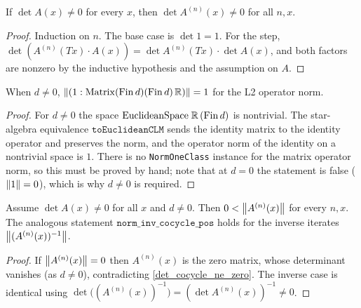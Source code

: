 \begin{lemma}\label{det_cocycle_ne_zero}
  \leanok
  If \(\det A(x) \neq 0\) for every \(x\), then \(\det A^{(n)}(x) \neq 0\) for all
  \(n, x\).
\end{lemma}
\begin{proof}\leanok
  Induction on \(n\). The base case is \(\det 1 = 1\). For the step,
  \(\det(A^{(n)}(Tx)\cdot A(x)) = \det A^{(n)}(Tx)\cdot \det A(x)\), and both factors are
  nonzero by the inductive hypothesis and the assumption on \(A\).
\end{proof}

\begin{lemma}\label{norm_one_matrix}
  \leanok
  When \(d \neq 0\), \(\left\lVert (1 : \operatorname{Matrix}(\operatorname{Fin} d)(\operatorname{Fin} d)\,\mathbb{R}) \right\rVert = 1\) for the L2 operator
  norm.
\end{lemma}
\begin{proof}\leanok
  For \(d \neq 0\) the space \(\mathrm{EuclideanSpace}\;\mathbb{R}\,(\operatorname{Fin} d)\) is nontrivial. The
  star-algebra equivalence \(\texttt{toEuclideanCLM}\) sends the identity matrix to the
  identity operator and preserves the norm, and the operator norm of the identity on a
  nontrivial space is \(1\). There is no \texttt{NormOneClass} instance for the matrix
  operator norm, so this must be proved by hand; note that at \(d = 0\) the statement is
  false (\(\left\lVert 1 \right\rVert = 0\)), which is why \(d \neq 0\) is required.
\end{proof}

\begin{lemma}\label{norm_cocycle_pos}
  \leanok
  Assume \(\det A(x) \neq 0\) for all \(x\) and \(d \neq 0\). Then
  \(0 < \left\lVert A^{(n)}(x) \right\rVert\) for every \(n, x\). The analogous statement
  \(\texttt{norm\_inv\_cocycle\_pos}\) holds for the inverse iterates
  \(\left\lVert (A^{(n)}(x))^{-1} \right\rVert\).
\end{lemma}
\begin{proof}\leanok
  If \(\left\lVert A^{(n)}(x) \right\rVert = 0\) then \(A^{(n)}(x)\) is the zero matrix, whose determinant
  vanishes (as \(d \neq 0\)), contradicting \ref{det_cocycle_ne_zero}. The inverse case is
  identical using \(\det\bigl((A^{(n)}(x))^{-1}\bigr) = (\det A^{(n)}(x))^{-1} \neq 0\).
\end{proof}

